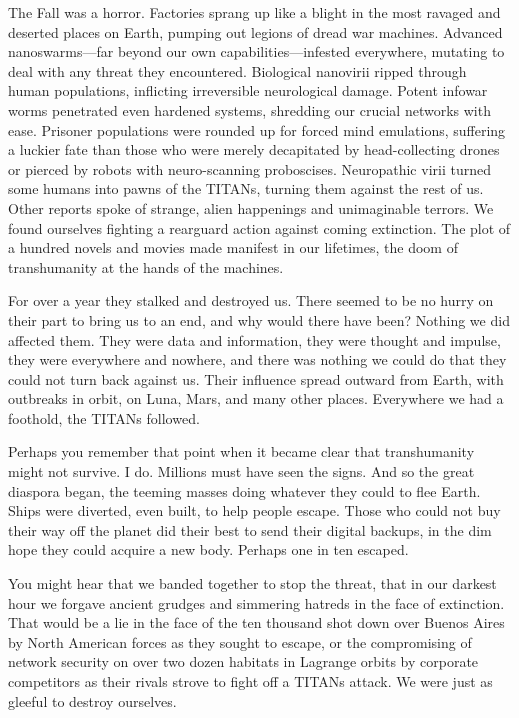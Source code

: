 The Fall was a horror. Factories sprang up like a 
blight in the most ravaged and deserted places on 
Earth, pumping out legions of dread war machines. 
Advanced nanoswarms—far beyond our own capabilities—infested
everywhere, mutating to deal with
any threat they encountered. Biological nanovirii 
ripped through human populations, inflicting irreversible
neurological damage. Potent infowar worms
penetrated even hardened systems, shredding our 
crucial networks with ease. Prisoner populations were 
rounded up for forced mind emulations, suffering a 
luckier fate than those who were merely decapitated 
by head-collecting drones or pierced by robots with 
neuro-scanning proboscises. Neuropathic virii turned 
some humans into pawns of the TITANs, turning 
them against the rest of us. Other reports spoke of 
strange, alien happenings and unimaginable terrors. 
We found ourselves fighting a rearguard action against 
coming extinction. The plot of a hundred novels and 
movies made manifest in our lifetimes, the doom of 
transhumanity at the hands of the machines.

For over a year they stalked and destroyed us. 
There seemed to be no hurry on their part to bring us 
to an end, and why would there have been? Nothing 
we did affected them. They were data and information, 
they were thought and impulse, they were everywhere 
and nowhere, and there was nothing we could do that 
they could not turn back against us. Their influence 
spread outward from Earth, with outbreaks in orbit, 
on Luna, Mars, and many other places. Everywhere 
we had a foothold, the TITANs followed.

Perhaps you remember that point when it became 
clear that transhumanity might not survive. I do. Millions
must have seen the signs. And so the great diaspora
began, the teeming masses doing whatever they
could to flee Earth. Ships were diverted, even built, to 
help people escape. Those who could not buy their 
way off the planet did their best to send their digital 
backups, in the dim hope they could acquire a new 
body. Perhaps one in ten escaped.

You might hear that we banded together to stop 
the threat, that in our darkest hour we forgave ancient
grudges and simmering hatreds in the face of
extinction. That would be a lie in the face of the ten 
thousand shot down over Buenos Aires by North 
American forces as they sought to escape, or the 
compromising of network security on over two dozen 
habitats in Lagrange orbits by corporate competitors 
as their rivals strove to fight off a TITANs attack. We 
were just as gleeful to destroy ourselves.

